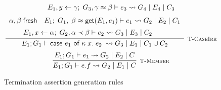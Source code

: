 \begin{figure}
\[{\begin{array}{c}
                E_1, y \leftarrow \gamma;\; G_3, \gamma \approx \beta 
                    \vdash e_3 \rightsquigarrow G_4\; |\; E_4\; |\; C_3
            \end{array}
        }
    \]
    \vspace{0.5pt}
    \[
        \infer[\textsc{\footnotesize T-CaseIrr}]{
            E_1; G_1 \vdash \textsf{case } e_1 \textsf{ of } \kappa\; x.\; e_2\; 
                \rightsquigarrow G_3\; |\; E_1\; |\; C_1 \cup C_2
        }{
            \begin{array}{c}
                \alpha, \beta\; \textsf{fresh}
                \hspace{1em}
                E_1;\; G_1,\; \beta \teq \textsf{get}(E_1, e_1)  \vdash e_1 
                    \rightsquigarrow G_2\; |\; E_2\; |\; C_1 \\[5pt]
                E_1, x \leftarrow \alpha;\; G_2, \alpha \tlt \beta 
                    \vdash e_2 \rightsquigarrow G_3\; |\; E_3\; |\; C_2
                \hspace{2em}
            \end{array}
        }
    \]
    \vspace{0.5pt}
    \[
        \infer[\textsc{\footnotesize T-Member}]{
            E_1; G_1 \vdash e.f
                \rightsquigarrow G_2\; |\; E_1\; |\; C
        }{
            E_1; G_1 \vdash e_1 \rightsquigarrow G_2\; |\; E_2\; |\; C
        }
    \]
    \caption{Termination assertion generation rules}
    \label{fig:terminationassertiongen}
\end{figure}

